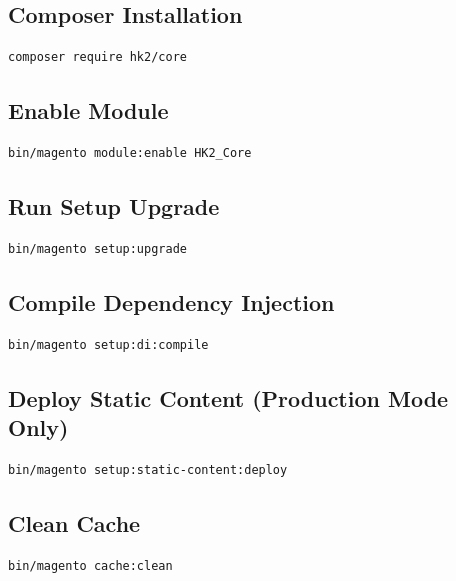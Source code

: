 \documentclass[11pt,a4paper]{article}
\begin{document}
\subsection{Composer Installation}

\begin{lstlisting}[style=shell]
composer require hk2/core
\end{lstlisting}

\subsection{Enable Module}

\begin{lstlisting}[style=shell]
bin/magento module:enable HK2_Core
\end{lstlisting}

\subsection{Run Setup Upgrade}

\begin{lstlisting}[style=shell]
bin/magento setup:upgrade
\end{lstlisting}

\subsection{Compile Dependency Injection}

\begin{lstlisting}[style=shell]
bin/magento setup:di:compile
\end{lstlisting}

\subsection{Deploy Static Content (Production Mode Only)}

\begin{lstlisting}[style=shell]
bin/magento setup:static-content:deploy
\end{lstlisting}

\subsection{Clean Cache}

\begin{lstlisting}[style=shell]
bin/magento cache:clean
\end{lstlisting}
\end{document}
